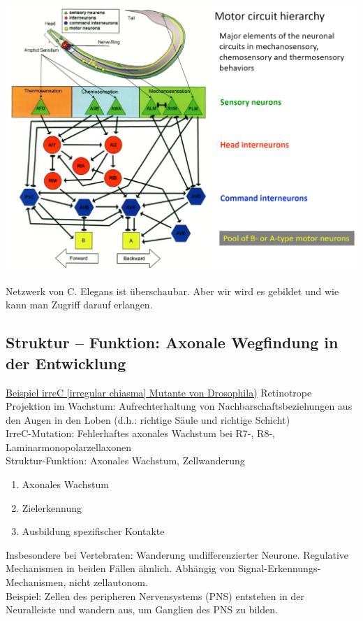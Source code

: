 \includegraphics[width=1\textwidth]{lectures/160511/pix/c_elegans_neurones.png}
\\\\
Netzwerk von C. Elegans ist überschaubar. Aber wir wird es gebildet und wie kann man Zugriff darauf erlangen.\\


\subsection{Struktur -- Funktion: Axonale Wegfindung in der Entwicklung}
\underline{Beispiel irreC [irregular chiasma] Mutante von Drosophila)}
Retinotrope Projektion im Wachstum: Aufrechterhaltung von Nachbarschaftsbeziehungen aus den Augen in den Loben (d.h.: richtige Säule und richtige Schicht)\\

IrreC-Mutation: Fehlerhaftes axonales Wachstum bei R7-, R8-, Laminarmonopolarzellaxonen\\

Struktur-Funktion: Axonales Wachstum, Zellwanderung
\begin{enumerate}
	\item Axonales Wachstum
	\item Zielerkennung
	\item Ausbildung spezifischer Kontakte
\end{enumerate}

Insbesondere bei Vertebraten: Wanderung undifferenzierter Neurone.
Regulative Mechanismen in beiden Fällen ähnlich. Abhängig von Signal-Erkennungs-Mechanismen, nicht zellautonom.\\

Beispiel: Zellen des peripheren Nervensystems (PNS) entstehen in der Neuralleiste und wandern aus, um Ganglien des PNS zu bilden.
